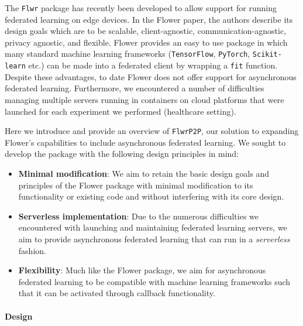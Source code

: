\documentclass[twocolumn, switch]{article} %
\begin{document}
The \texttt{Flwr} package \cite{flower} has recently been developed to allow support for running federated learning on edge devices. In the Flower paper, the authors describe its design goals which are to be scalable, client-agnostic, communication-agnostic, privacy agnostic, and flexible. Flower provides an easy to use package in which many standard machine learning frameworks (\texttt{TensorFlow}, \texttt{PyTorch}, \texttt{Scikit-learn} etc.) can be made into a federated client by wrapping a \texttt{fit} function. Despite these advantages, to date Flower does not offer support for asynchronous federated learning. Furthermore, we encountered a number of difficulties managing multiple servers running in containers on cloud platforms that were launched for each experiment we performed (healthcare setting).

Here we introduce and provide an overview of \texttt{FlwrP2P}, our solution to expanding Flower's capabilities to include asynchronous federated learning. We sought to develop the package with the following design principles in mind:

\begin{itemize}
    \item \textbf{Minimal modification}: We aim to retain the basic design goals and principles of the Flower package with minimal modification to its functionality or existing code and without interfering with its core design.
    \item \textbf{Serverless implementation}: Due to the numerous difficulties we encountered with launching and maintaining federated learning servers, we aim to provide asynchronous federated learning that can run in a \textit{serverless} fashion.
    \item \textbf{Flexibility}: Much like the Flower package, we aim for asynchronous federated learning to be compatible with machine learning frameworks such that it can be activated through callback functionality.
\end{itemize}

\paragraph{Design}
\end{document}

